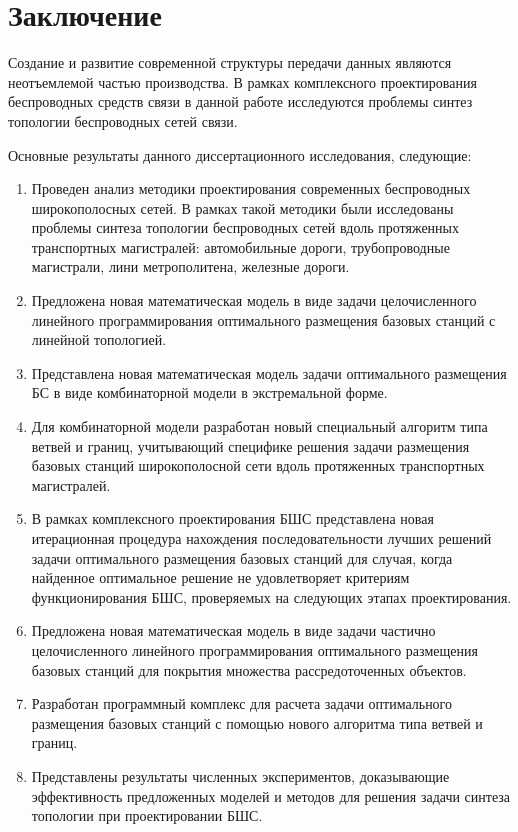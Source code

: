 \chapter*{Заключение}                       %
Создание и развитие современной структуры передачи данных являются неотъемлемой частью производства. В рамках комплексного проектирования беспроводных средств связи в данной работе исследуются проблемы синтез топологии беспроводных сетей связи.

Основные результаты данного диссертационного исследования, следующие:

\begin{enumerate}
    \item Проведен анализ методики проектирования современных беспроводных широкополосных сетей. В рамках такой методики были исследованы проблемы синтеза топологии беспроводных сетей вдоль протяженных транспортных магистралей: автомобильные дороги, трубопроводные магистрали, лини метрополитена, железные дороги. 
    \item Предложена новая математическая модель в виде задачи целочисленного линейного программирования оптимального размещения базовых станций с линейной топологией.
    \item Представлена новая математическая модель задачи оптимального размещения БС в виде комбинаторной модели в экстремальной форме. 
    \item Для комбинаторной модели разработан новый специальный алгоритм типа ветвей и границ, учитывающий специфике решения задачи размещения базовых станций широкополосной сети вдоль протяженных транспортных магистралей.  
    
    \item В рамках комплексного проектирования БШС представлена новая итерационная процедура нахождения последовательности лучших решений задачи оптимального размещения базовых станций для случая, когда найденное оптимальное решение не удовлетворяет  критериям функционирования БШС, проверяемых на следующих этапах проектирования.
    \item Предложена новая математическая модель в виде задачи частично целочисленного линейного программирования оптимального размещения базовых станций для покрытия множества рассредоточенных объектов. 
    \item Разработан программный комплекс для расчета задачи оптимального размещения базовых станций с помощью нового алгоритма типа ветвей и границ.
    \item Представлены результаты численных экспериментов, доказывающие эффективность предложенных моделей и методов для решения задачи синтеза топологии при проектировании БШС.
\end{enumerate}

